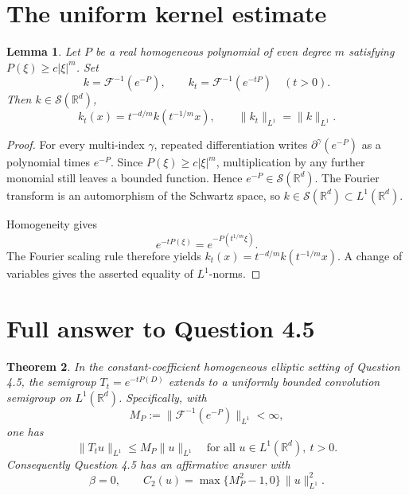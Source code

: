 \documentclass[11pt]{article}
\newtheorem{theorem}{Theorem}
\newtheorem{lemma}[theorem]{Lemma}
\theoremstyle{remark}
\newcommand{\R}{\mathbb R}
\newcommand{\F}{\mathcal F}
\begin{document}
\section{The uniform kernel estimate}

\begin{lemma}\label{lem:kernel}
Let \(P\) be a real homogeneous polynomial of even degree \(m\) satisfying
\(P(\xi)\ge c|\xi|^m\).  Set
\[
 k=\F^{-1}(e^{-P}),\qquad
 k_t=\F^{-1}(e^{-tP})\quad(t>0).
\]
Then \(k\in\mathcal S(\R^d)\),
\[
 k_t(x)=t^{-d/m}k(t^{-1/m}x),
 \qquad
 \|k_t\|_{L^1}=\|k\|_{L^1}.
\]
\end{lemma}

\begin{proof}
For every multi-index \(\gamma\), repeated differentiation writes
\(\partial^\gamma(e^{-P})\) as a polynomial times \(e^{-P}\).  Since
\(P(\xi)\ge c|\xi|^m\), multiplication by any further monomial still leaves
a bounded function.  Hence \(e^{-P}\in\mathcal S(\R^d)\).  The Fourier
transform is an automorphism of the Schwartz space, so
\(k\in\mathcal S(\R^d)\subset L^1(\R^d)\).

Homogeneity gives
\[
 e^{-tP(\xi)}=e^{-P(t^{1/m}\xi)}.
\]
The Fourier scaling rule therefore yields
\(k_t(x)=t^{-d/m}k(t^{-1/m}x)\).  A change of variables gives the asserted
equality of \(L^1\)-norms.
\end{proof}

\section{Full answer to Question 4.5}

\begin{theorem}\label{thm:answer}
In the constant-coefficient homogeneous elliptic setting of Question 4.5,
the semigroup \(T_t=e^{-tP(D)}\) extends to a uniformly bounded convolution
semigroup on \(L^1(\R^d)\).  Specifically, with
\[
 M_P:=\bigl\|\F^{-1}(e^{-P})\bigr\|_{L^1}<\infty,
\]
one has
\[
 \boxed{\ \|T_tu\|_{L^1}\le M_P\|u\|_{L^1}
 \quad\text{for all }u\in L^1(\R^d),\ t>0.\ }
\]
Consequently Question 4.5 has an affirmative answer with
\[
 \beta=0,
 \qquad
 C_2(u)=\max\{M_P^2-1,0\}\,\|u\|_{L^1}^2.
\]
\end{theorem}
\end{document}
